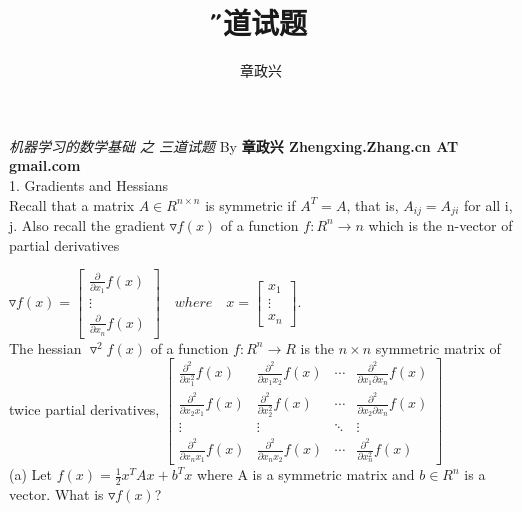 \documentclass[12pt]{article}
\title{\H 三道试题}
\author{章政兴}
\begin{document}
\emph{机器学习的数学基础 之 三道试题 } By \textbf{章政兴 Zhengxing.Zhang.cn AT gmail.com}\\
1. Gradients and Hessians\\
Recall that a matrix $A\in{R}^{n\times n}$ is symmetric if $A^T=A$, that is, ${A}_{ij}={A}_{ji}$ for all i, j. Also
recall the gradient $\triangledown f(x)$ of a function $f:{R}^{n} \rightarrow n$ which is the n-vector of partial derivatives

$\triangledown f(x) = 
\begin{bmatrix}
\frac { \partial  }{ \partial { x }_{ 1 } }f(x)\\
\vdots\\
\frac { \partial  }{ \partial { x }_{ n }}f(x)
\end{bmatrix}
\quad where \quad x = 
\begin{bmatrix}
{x}_{1} \\ 
\vdots \\
{x}_{n}
\end{bmatrix}
$.\\
The hessian ${\triangledown}^{2}f(x)$ of a function $f:{R}^{n} \rightarrow R$ is the $n \times n$ symmetric matrix of twice partial
derivatives,
$\begin{bmatrix}
\frac{{\partial}^{2}}{\partial {x}_{1}^{2}}f(x) & \frac{{\partial}^{2}}{\partial {x}_{1} {x}_{2}}f(x) & \cdots & \frac{{\partial}^{2}}{\partial {x}_{1} \partial {x}_{n}}f(x) \\
\frac{{\partial}^{2}}{\partial {x}_{2}{x}_{1}}f(x) & \frac{{\partial}^{2}}{\partial {x}_{2}^{2}}f(x) & \cdots & \frac{{\partial}^{2}}{\partial {x}_{2} \partial {x}_{n}}f(x) \\
\vdots & \vdots & \ddots &\vdots \\
\frac{{\partial}^{2}}{\partial {x}_{n}{x}_{1}}f(x) &
\frac{{\partial}^{2}}{\partial {x}_{n}{x}_{2}}f(x) &
\cdots &
\frac{{\partial}^{2}}{\partial {x}_{n}^{2}}f(x)  
\end{bmatrix}$
\\
(a) Let $f(x)=\frac{1}{2}{x}^{T}Ax + {b}^{T}x$ where A is a symmetric matrix and $b \in {R}^{n}$ is a vector. What is $\triangledown f(x)$?\\
\end{document}
